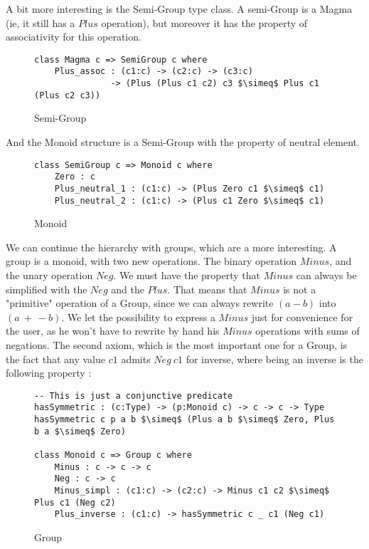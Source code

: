 A bit more interesting is the Semi-Group type class. A semi-Group is a Magma (ie, it still has a $Plus$ operation), but moreover it has the property of associativity for this operation.

\begin{figure}[H]
\figrule
\begin{center}
\begin{lstlisting}
class Magma c => SemiGroup c where
    Plus_assoc : (c1:c) -> (c2:c) -> (c3:c) 
               -> (Plus (Plus c1 c2) c3 $\simeq$ Plus c1 (Plus c2 c3))
\end{lstlisting}
\end{center}
\caption{Semi-Group}
\figrule
\end{figure}

And the Monoid structure is a Semi-Group with the property of neutral element.

\begin{figure}[H]
\figrule
\begin{center}
\begin{lstlisting}
class SemiGroup c => Monoid c where
    Zero : c    
    Plus_neutral_1 : (c1:c) -> (Plus Zero c1 $\simeq$ c1)    
    Plus_neutral_2 : (c1:c) -> (Plus c1 Zero $\simeq$ c1)
\end{lstlisting}
\end{center}
\caption{Monoid}
\figrule
\end{figure}
We can continue the hierarchy with groups, which are a more interesting.
A group is a monoid, with two new operations. The binary operation $Minus$, and the unary operation $Neg$. We must have the property that $Minus$ can always be simplified with the $Neg$ and the $Plus$. That means that $Minus$ is not a "primitive" operation of a Group, since we can always rewrite $(a-b)$ into $(a\ +\ -b)$. We let the possibility to express a $Minus$ just for convenience for the user, as he won't have to rewrite by hand his $Minus$ operations with sums of negations.
The second axiom, which is the most important one for a Group, is the fact that any value $c1$ admits $Neg\ c1$ for inverse, where being an inverse is the following property :

\begin{figure}[H]
\figrule
\begin{center}
\begin{lstlisting}
-- This is just a conjunctive predicate
hasSymmetric : (c:Type) -> (p:Monoid c) -> c -> c -> Type
hasSymmetric c p a b $\simeq$ (Plus a b $\simeq$ Zero, Plus b a $\simeq$ Zero)    
  
class Monoid c => Group c where
    Minus : c -> c -> c
    Neg : c -> c
    Minus_simpl : (c1:c) -> (c2:c) -> Minus c1 c2 $\simeq$ Plus c1 (Neg c2) 
    Plus_inverse : (c1:c) -> hasSymmetric c _ c1 (Neg c1)
\end{lstlisting}
\end{center}
\caption{Group}
\figrule
\end{figure}


